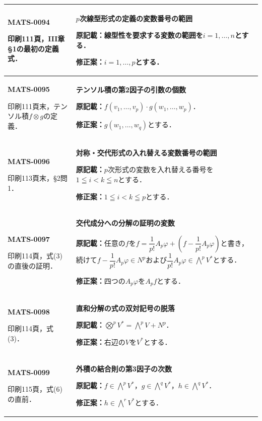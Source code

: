 \documentclass[a4paper,10pt]{ltjsarticle}
\begin{document}
\begin{longtable}{@{}>{\raggedright\arraybackslash}p{.19\linewidth}>{\raggedright\arraybackslash}p{.77\linewidth}@{}}
\hline
\hypertarget{MATS-0094}{}\textbf{MATS-0094}\par 印刷111頁，III章§1の最初の定義式． & \textbf{$p$次線型形式の定義の変数番号の範囲}\par\textbf{原記載：}線型性を要求する変数の範囲を$i=1,\ldots,n$とする．\par\textbf{修正案：}$i=1,\ldots,p$とする． \\[3pt]
\hline
\hypertarget{MATS-0095}{}\textbf{MATS-0095}\par 印刷111頁末，テンソル積$f\otimes g$の定義． & \textbf{テンソル積の第2因子の引数の個数}\par\textbf{原記載：}$f(v_1,\ldots,v_p)\cdot g(w_1,\ldots,w_p)$．\par\textbf{修正案：}$g(w_1,\ldots,w_q)$とする． \\[3pt]
\hline
\hypertarget{MATS-0096}{}\textbf{MATS-0096}\par 印刷113頁末，§2問1． & \textbf{対称・交代形式の入れ替える変数番号の範囲}\par\textbf{原記載：}$p$次形式の変数を入れ替える番号を$1\leqq i<k\leqq n$とする．\par\textbf{修正案：}$1\leqq i<k\leqq p$とする． \\[3pt]
\hline
\hypertarget{MATS-0097}{}\textbf{MATS-0097}\par 印刷114頁，式(3)の直後の証明． & \textbf{交代成分への分解の証明の変数}\par\textbf{原記載：}任意の$f$を$f=\dfrac1{p!}A_p\varphi+(f-\dfrac1{p!}A_p\varphi)$と書き，続けて$f-\dfrac1{p!}A_p\varphi\in N^p$および$\dfrac1{p!}A_p\varphi\in\overset p\bigwedge V^*$とする．\par\textbf{修正案：}四つの$A_p\varphi$を$A_pf$とする． \\[3pt]
\hline
\hypertarget{MATS-0098}{}\textbf{MATS-0098}\par 印刷114頁，式(3)． & \textbf{直和分解の式の双対記号の脱落}\par\textbf{原記載：}$\overset p\bigotimes V^*=\overset p\bigwedge V+N^p$．\par\textbf{修正案：}右辺の$V$を$V^*$とする． \\[3pt]
\hline
\hypertarget{MATS-0099}{}\textbf{MATS-0099}\par 印刷115頁，式(6)の直前． & \textbf{外積の結合則の第3因子の次数}\par\textbf{原記載：}$f\in\overset p\bigwedge V^*$，$g\in\overset q\bigwedge V^*$，$h\in\overset q\bigwedge V^*$．\par\textbf{修正案：}$h\in\overset r\bigwedge V^*$とする． \\[3pt]

\end{longtable}
\end{document}
